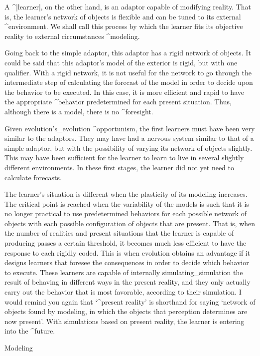 A ^|learner|, on the other hand, is an adaptor capable of modifying
reality. That is, the learner's network of objects is flexible and can
be tuned to its external ^{environment}. We shall call this process by
which the learner fits its objective reality to external circumstances
^{modeling}.

Going back to the simple adaptor, this adaptor has a rigid network of
objects. It could be said that this adaptor's model of the exterior is
rigid, but with one qualifier. With a rigid network, it is not useful
for the network to go through the intermediate step of calculating the
forecast of the model in order to decide upon the behavior to be
executed. In this case, it is more efficient and rapid to have the
appropriate ^{behavior} predetermined for each present situation. Thus,
although there is a model, there is no ^{foresight}.

Given evolution's_{evolution} ^{opportunism}, the first learners must
have been very similar to the adaptors. They may have had a nervous
system similar to that of a simple adaptor, but with the possibility of
varying its network of objects slightly. This may have been sufficient
for the learner to learn to live in several slightly different
environments. In these first stages, the learner did not yet need to
calculate forecasts.

The learner's situation is different when the plasticity of its modeling
increases. The critical point is reached when the variability of the
models is such that it is no longer practical to use predetermined
behaviors for each possible network of objects with each possible
configuration of objects that are present. That is, when the number of
realities and present situations that the learner is capable of
producing passes a certain threshold, it becomes much less efficient to
have the response to each rigidly coded. This is when evolution obtains
an advantage if it designs learners that foresee the consequences in
order to decide which behavior to execute. These learners are capable of
internally simulating_{simulation} the result of behaving in different
ways in the present reality, and they only actually carry out the
behavior that is most favorable, according to their simulation. I would
remind you again that `^{present} reality' is shorthand for saying
`network of objects found by modeling, in which the objects that
perception determines are now present'. With simulations based on
present reality, the learner is entering into the ^{future}.


\Section Modeling

